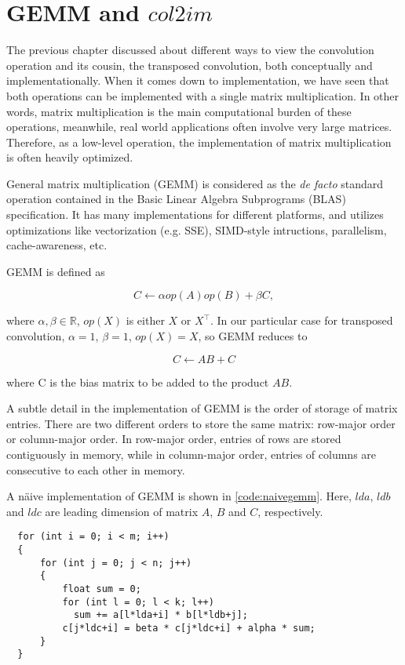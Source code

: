 
\chapter{GEMM and $col2im$}

The previous chapter discussed about different ways to view the convolution operation and its cousin,
the transposed convolution, both conceptually and implementationally. When it comes down to implementation,
we have seen that both operations can be implemented with a single matrix multiplication. In other words,
matrix multiplication is the main computational burden of these operations, meanwhile, real world applications
often involve very large matrices. Therefore, as a low-level operation, the implementation of matrix
multiplication is often heavily optimized.

General matrix multiplication (GEMM) is considered as the \textit{de facto} standard operation
contained in the Basic Linear Algebra Subprograms (BLAS) specification. It has many implementations for
different platforms, and utilizes optimizations like vectorization (e.g. SSE), SIMD-style intructions,
parallelism, cache-awareness, etc.


GEMM is defined as

$$C \leftarrow \alpha op(A) op(B) + \beta C,$$

where $\alpha, \beta \in \mathbb{R}$, $op(X)$ is either $X$ or $X^\intercal$. In our particular case for transposed convolution, $\alpha = 1$, $\beta = 1$, $op(X) = X$, so GEMM reduces to

$$C \leftarrow A B + C$$

where C is the bias matrix to be added to the product $A B$.

A subtle detail in the implementation of GEMM is the order of storage of matrix entries. There are two
different orders to store the same matrix: row-major order or column-major order. In row-major order,
entries of rows are stored contiguously in memory, while in column-major order, entries of columns are
consecutive to each other in memory.

A näive implementation of GEMM is shown in \ref{code:naivegemm}. Here, $lda$, $ldb$ and $ldc$ are leading
dimension of matrix $A$, $B$ and $C$, respectively.

\begin{code}
  \begin{verbatim}
  for (int i = 0; i < m; i++)
  {
      for (int j = 0; j < n; j++)
      {
          float sum = 0;
          for (int l = 0; l < k; l++)
            sum += a[l*lda+i] * b[l*ldb+j];
          c[j*ldc+i] = beta * c[j*ldc+i] + alpha * sum;
      }
  }
  \end{verbatim}
  \label{code:naivegemm}
\end{code}

